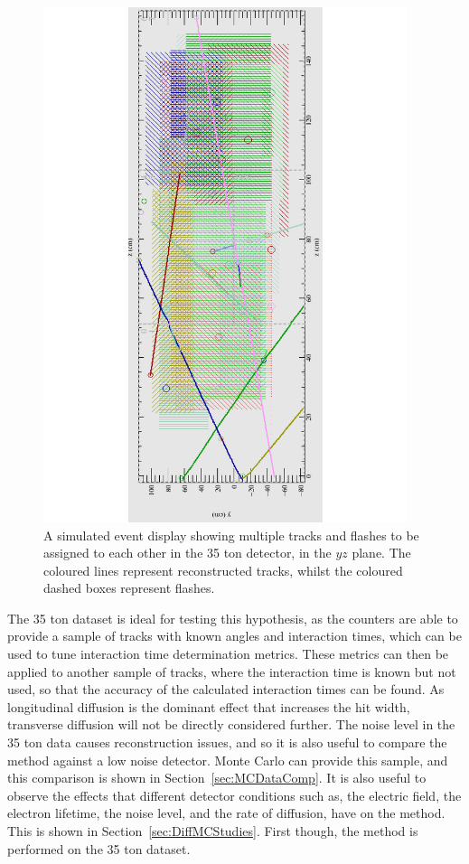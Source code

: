 \begin{figure}
  \centering
  \includegraphics[width=0.95\textwidth]{LotsOfTrackFlash}
  \caption[A simulated event display showing multiple tracks and flashes in the 35 ton detector]
          {A simulated event display showing multiple tracks and flashes to be assigned to each other in the 35 ton detector, in the $yz$ plane. The coloured lines represent reconstructed tracks, whilst the coloured dashed boxes represent flashes.}
          \label{fig:DiffLotsOfFlashes}
\end{figure}

The 35 ton dataset is ideal for testing this hypothesis, as the counters are able to provide a sample of tracks with known angles and interaction times, which can be used to tune interaction time determination metrics. These metrics can then be applied to another sample of tracks, where the interaction time is known but not used, so that the accuracy of the calculated interaction times can be found. As longitudinal diffusion is the dominant effect that increases the hit width, transverse diffusion will not be directly considered further. The noise level in the 35 ton data causes reconstruction issues, and so it is also useful to compare the method against a low noise detector. Monte Carlo can provide this sample, and this comparison is shown in Section~\ref{sec:MCDataComp}. It is also useful to observe the effects that different detector conditions such as, the electric field, the electron lifetime, the noise level, and the rate of diffusion, have on the method. This is shown in Section~\ref{sec:DiffMCStudies}. First though, the method is performed on the 35 ton dataset.

